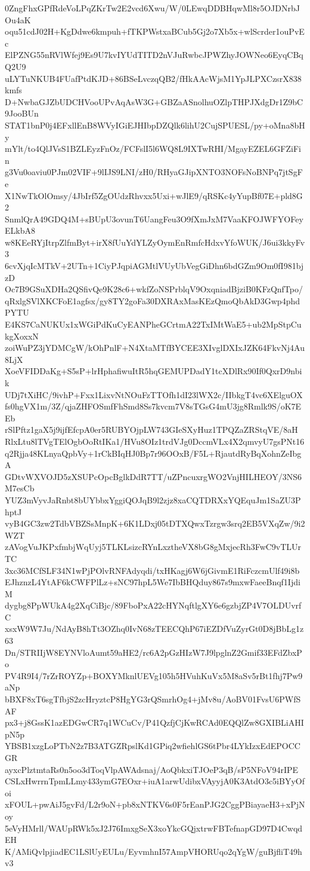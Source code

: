 0ZngFhxGPfRdeVoLPqZKrTw2E2vcd6Xwu/W/0LEwqDDBHqwMl8r5OJDNrbJOu4aK
oqu51cdJ02H+KgDdwe6kmpuh+fTKPWstxaBCub5Gj2o7Xb5x+wlScrder1ouPvEc
ElPZNG55nRVlWfej9Es9U7kvIYUdTITD2nVJuRwbcJPWZhyJOWNeo6EyqCBqQ2U9
uLYTuNKUB4FUafPtdKJD+86BSeLvczqQB2/fHkAAcWjsM1YpJLPXCzsrX838kmfs
D+NwbaGJZbUDCHVooUPvAqAsW3G+GBZaASnolhuOZlpTHPJXdgDr1Z9bC9JooBUn
STAT1bnP0j4EFxllEnB8WVyIGiEJHIbpDZQlk6lihU2CujSPUESL/py+oMna8bHy
mYlt/to4QlJVsS1BZLEyzFnOz/FCFslI5l6WQ8L9IXTwRHI/MgayEZEL6GFZiFin
g3Vu0oaviu0PJm02VIF+9lIJS9LNI/zH0/RHyaGJipXNTO3NOFsNoBNPq7jtSgFe
X1NwTkOlOmsy/4JbIrf5ZgOUdzRhvxx5Uxi+wJlE9/qRSKc4yYupBf07E+pld8G2
SnmlQrA49GDQ4M+sBUpU3ovunT6UangFeu3O9fXmJxM7VaaKFOJWFYOFeyELkbA8
w8KEeRYjItrpZlfmByt+irX8fUuYdYLZyOymEnRmfcHdxvYfoWUK/J6ui3kkyFv3
6cvXjqIcMTkV+2UTn+1CiyPJqpiAGMtlVUyUbVegGiDhn6bdGZm9Om0fI981bjzD
Oc7B9GSuXDHa2QSfivQe9K28c6+wkfZoNSPrblqV9OxqniadBjziB0KFzQnfTpo/
qRxlgSVlXKCFoE1agfsx/gy8TY2goFa30DXRAxMasKEzQmoQbAkD3Gwp4phdPYTU
E4KS7CaNUKUx1xWGiPdKuCyEANPheGCrtmA22TxIMtWaE5+ub2MpStpCukgXoxxN
zoiWuPZ3jYDMCgW/kOhPnlF+N4XtaMTfBYCEE3XIvglDXIxJZK64FkvNj4Au8LjX
XoeVFIDDaKg+S5sP+lrHphafiwuItR5hqGEMUPDadY1tcXDlRx90If0QxrD9nbik
UDj7tXiHC/9ivhP+Fxx1LixvNtNOuFzTTOfh1dI23lWX2c/IIbkgT4vc6XElguOX
fs0hgVX1m/3Z/qjaZHFOSmfFhSmd8Ss7kvcm7V8sTGsG4mU3jg8Rmlk9S/oK7EEb
rSlPftz1gaX5j9ijfEfcpA0er5RUBYOjpLW743GIeSXyHuz1TPQZaZRStqVE/8aH
RlxLtu8lTVgTElOgbOoRtIKa1/HVu8OIz1trdVJg0DccmVLx4X2qmvyU7gsPNt16
q2Rjja48KLnyaQpbVy+1rCkBIqHJ0Bp7r96OOxB/F5L+RjautdRyBqXohnZeIbgA
GDtvWXVOJD5zXSUPcOpcBglkDdR7TT/uZPncuxrgWO2VnjHILHEOY/3NS6M7esCb
YUZ3mVyvJaRnbt8bUYbbxYggiQOJqB9l2zjz8xaCQTDRXxYQEquJm1SaZU3PhptJ
vyB4GC3zw2TdbVBZSsMnpK+6K1LDxj05tDTXQwxTzrgw3srq2EB5VXqZw/9i2WZT
zAVogVuJKPxfmbjWqUyj5TLKLsizcRYnLxztheVX8bG8gMxjecRh3FwC9vTLUrTC
3xc36MCfSLF34N1wPjPOlvRNFAdyqdi/txHKagj6W6jGivmE1RiFczcmUlf49i8b
EJhznzL4YtAF6kCWFPlLz+sNC97hpL5We7IbBHQduy867s9mxwFaeeBnqf1IjdiM
dygbg8PpWUkA4g2XqCiBjc/89FboPxA22cHYNqftlgXY6e6gzbjZP4V7OLDUvrfC
xsxW9W7Ju/NdAyB8hTt3OZhq0IvN68zTEECQhP67iEZDfVuZyrGt0D8jBbLg1z63
Dn/STRIIjW8EYNVloAumt59aHE2/rc6A2pGzHIzW7J9lpglnZ2Gmif33EFdZbxPo
PV4R9I4/7rZrROYZp+BOXYMknlUEVg105h5HVuhKuVx5M8aSv5rBt1fhj7Pw9aNp
bBXF8xT6sgTfbjS2zcHryztcP8HgYG3rQSmrhOg4+jMv8u/AoBV01FvsU6PWfSAF
px3+j8GssK1azEDGwCR7q1WCuCv/P41QzfjCjKwRCAd0EQQlZw8GXIBLiAHIpN5p
YBSB1xzgLoPTbN2z7B3ATGZRpslKd1GPiq2wfiehlGS6tPbr4LYkIzxEdEPOCCGR
ayxcPlztmtaRs0n5oo3dToqVlpAWAdsnaj/AoQbkxiTJOeP3qB/sP5NFoV94rIPE
CSLxHwrrnTpmLLmy433ymG7EOxr+iuA1arwUdibxVAyyjA0K3AtdO3c5iBYyOfoi
xFOUL+pwAiJ5gvFd/L2r9oN+pb8xNTKV6s0F5rEanPJG2CggPBiayaeH3+xPjNoy
5eVyHMrll/WAUpRWk5xJ2J76ImxgSeX3xoYkcGQjxtrwFBTefnapGD97D4CwqdEH
K/AMiQvlpjiadEC1LSlUyEULu/EyvmhnI57AmpVHORUqo2qYgW/guBjfliT49hv3
